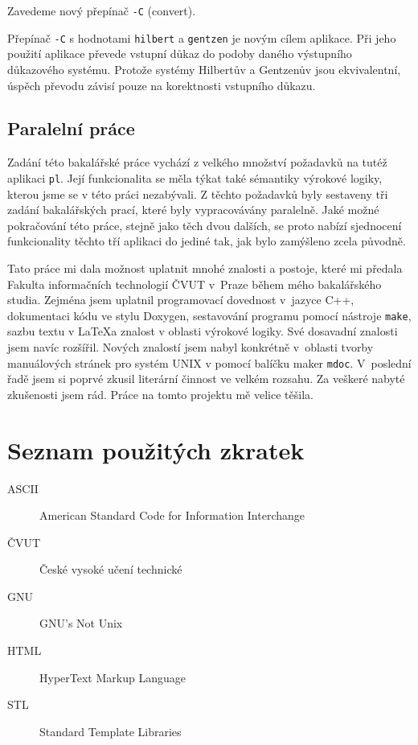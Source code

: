 \documentclass[thesis=B,czech,hidelinks]{thesis}[2012/06/26]
\begin{document}
Zavedeme nový přepínač \texttt{-C} (convert).

Přepínač \texttt{-C} s hodnotami \texttt{hilbert} a \texttt{gentzen} je novým cílem aplikace. Při jeho použití aplikace převede vstupní důkaz do podoby daného výstupního důkazového systému. Protože systémy Hilbertův a Gentzenův jsou ekvivalentní, úspěch převodu závisí pouze na korektnosti vstupního důkazu.

\section{Paralelní práce}

Zadání této bakalářské práce vychází z velkého množství požadavků na tutéž aplikaci \texttt{pl}. Její funkcionalita se měla týkat také sémantiky výrokové logiky, kterou jsme se v této práci nezabývali. Z těchto požadavků byly sestaveny tři zadání bakalářských prací, které byly vypracovávány paralelně. Jaké možné pokračování této práce, stejně jako těch dvou dalších, se proto nabízí sjednocení funkcionality těchto tří aplikaci do jediné tak, jak bylo zamýšleno zcela původně.

%
%
%

\begin{conclusion}
Tato práce mi dala možnost uplatnit mnohé znalosti a postoje, které mi předala Fakulta informačních technologií ČVUT v~Praze během mého bakalářského studia. Zejména jsem uplatnil programovací dovednost v~jazyce C++, dokumentaci kódu ve stylu Doxygen, sestavování programu pomocí nástroje \texttt{make}, sazbu textu v \LaTeX a znalost v oblasti výrokové logiky. Své dosavadní znalosti jsem navíc rozšířil. Nových znalostí jsem nabyl konkrétně v~oblasti tvorby manuálových stránek pro systém UNIX v pomocí balíčku maker \texttt{mdoc}. V~poslední řadě jsem si poprvé zkusil literární činnost ve velkém rozsahu. Za veškeré nabyté zkušenosti jsem rád. Práce na tomto projektu mě velice těšila.
\end{conclusion}

%
%
%




\appendix

%
%
%

\chapter{Seznam použitých zkratek}

\begin{description}
	\item[ASCII] American Standard Code for Information Interchange
	\item[ČVUT] České vysoké učení technické
	\item[GNU] GNU's Not Unix
	\item[HTML] HyperText Markup Language
	\item[STL] Standard Template Libraries
\end{description}
\end{document}
